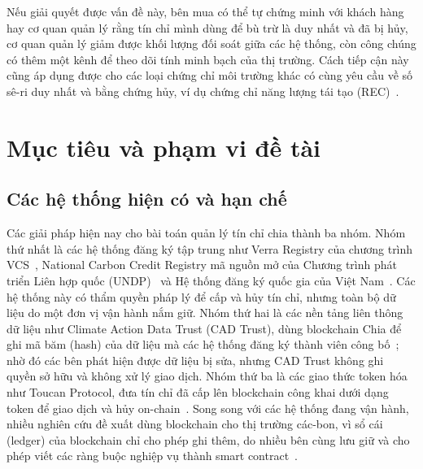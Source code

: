 Nếu giải quyết được vấn đề này, bên mua có thể tự chứng minh với khách hàng hay cơ quan quản lý rằng tín chỉ mình dùng để bù trừ là duy nhất và đã bị hủy, cơ quan quản lý giảm được khối lượng đối soát giữa các hệ thống, còn công chúng có thêm một kênh để theo dõi tính minh bạch của thị trường. Cách tiếp cận này cũng áp dụng được cho các loại chứng chỉ môi trường khác có cùng yêu cầu về số sê-ri duy nhất và bằng chứng hủy, ví dụ chứng chỉ năng lượng tái tạo (REC)~\cite{liu2024blockchain}.

\section{Mục tiêu và phạm vi đề tài}
\label{sec:muctieu}
\label{sec:nhiemvu}

\subsection*{Các hệ thống hiện có và hạn chế}
\label{subsec:hethonghienco}

Các giải pháp hiện nay cho bài toán quản lý tín chỉ chia thành ba nhóm. Nhóm thứ nhất là các hệ thống đăng ký tập trung như Verra Registry của chương trình VCS~\cite{verra2024vcs}, National Carbon Credit Registry mã nguồn mở của Chương trình phát triển Liên hợp quốc (UNDP)~\cite{undp2024nationalregistry} và Hệ thống đăng ký quốc gia của Việt Nam~\cite{vietnam2026thongtu11}. Các hệ thống này có thẩm quyền pháp lý để cấp và hủy tín chỉ, nhưng toàn bộ dữ liệu do một đơn vị vận hành nắm giữ. Nhóm thứ hai là các nền tảng liên thông dữ liệu như Climate Action Data Trust (CAD Trust), dùng blockchain Chia để ghi mã băm (hash) của dữ liệu mà các hệ thống đăng ký thành viên công bố~\cite{cadtrust2025datamodel}; nhờ đó các bên phát hiện được dữ liệu bị sửa, nhưng CAD Trust không ghi quyền sở hữu và không xử lý giao dịch. Nhóm thứ ba là các giao thức token hóa như Toucan Protocol, đưa tín chỉ đã cấp lên blockchain công khai dưới dạng token để giao dịch và hủy on-chain~\cite{toucan2025docs}. Song song với các hệ thống đang vận hành, nhiều nghiên cứu đề xuất dùng blockchain cho thị trường các-bon, vì sổ cái (ledger) của blockchain chỉ cho phép ghi thêm, do nhiều bên cùng lưu giữ và cho phép viết các ràng buộc nghiệp vụ thành smart contract~\cite{kim2020blockchain,sipthorpe2022blockchain}.

